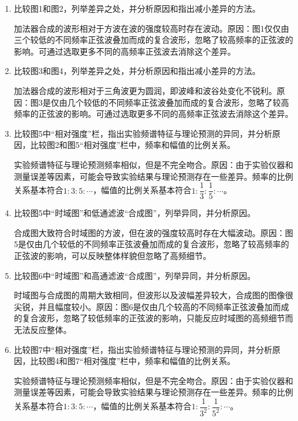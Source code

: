 \documentclass[11pt]{article}
\begin{document}
\begin{enumerate}
    \item 比较图1和图2，列举差异之处，并分析原因和指出减小差异的方法。
    
    加法器合成的波形相对于方波在波的强度较高时存在波动。原因：图1仅仅由三个较低的不同频率正弦波叠加而成的复合波形，忽略了较高频率的正弦波的影响。可通过选取更多不同的高频率正弦波去消除这个差异。

    \item 比较图3和图4，列举差异之处，并分析原因和指出减小差异的方法。
    
    加法器合成的波形相对于三角波更为圆润，即波峰和波谷处变化不锐利。原因：图3是仅由几个较低的不同频率正弦波叠加而成的复合波形，忽略了较高频率的正弦波的影响。可通过选取更多不同的高频率正弦波去消除这个差异。

    \item 比较图5中“相对强度”栏，指出实验频谱特征与理论预测的异同，并分析原因，比较图2和图5“相对强度”栏中，频率和幅值的比例关系。
    
    实验频谱特征与理论预测频率相似，但是不完全吻合。原因：由于实验仪器和测量误差等因素，可能会导致实验结果与理论预测存在一些差异。频率的比例关系基本符合$1:3:5:\cdots$，幅值的比例关系基本符合$1:\dfrac{1}{3}:\dfrac{1}{5}:\cdots$。

    \item 比较图5中“时域图”和低通滤波“合成图”，列举异同，并分析原因。
    
    合成图大致符合时域图的方波，但在波的强度较高时存在大幅波动。原因：图5是仅由几个较低的不同频率正弦波叠加而成的复合波形，忽略了较高频率的正弦波的影响，可以反映整体样貌但忽略了高频细节。

    \item 比较图6中“时域图”和高通滤波“合成图”，列举异同，并分析原因。
    
    时域图与合成图的周期大致相同，但波形以及波幅差异较大，合成图的图像很尖锐，并且幅度较小。原因：图6是仅由几个较高的不同频率正弦波叠加而成的复合波形，忽略了较低频率的正弦波的影响，只能反应时域图的高频细节而无法反应整体。

    \item 比较图7中“相对强度”栏，指出实验频谱特征与理论预测的异同，并分析原因，比较图4和图7“相对强度”栏中，频率和幅值的比例关系。
    
    实验频谱特征与理论预测频率相似，但是不完全吻合。原因：由于实验仪器和测量误差等因素，可能会导致实验结果与理论预测存在一些差异。频率的比例关系基本符合$1:3:5:\cdots$，幅值的比例关系基本符合$1:\dfrac{1}{3^2}:\dfrac{1}{5^2}:\cdots$。


\end{enumerate}
\end{document}
